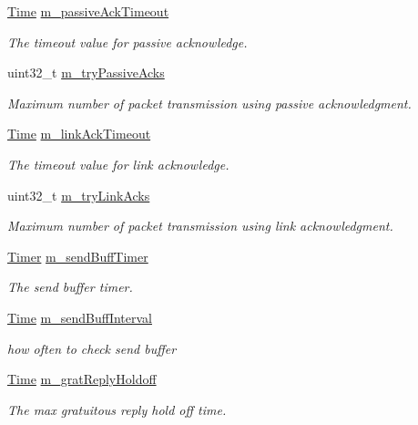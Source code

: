 \begin{DoxyCompactItemize}
\hyperlink{classns3_1_1Time}{Time} \hyperlink{classns3_1_1dsr_1_1DsrRouting_a6155bddae63f0e1fda8afbeebc25a54c}{m\+\_\+passive\+Ack\+Timeout}
\begin{DoxyCompactList}\small\item\em The timeout value for passive acknowledge. \end{DoxyCompactList}\item 
uint32\+\_\+t \hyperlink{classns3_1_1dsr_1_1DsrRouting_aadd1dd676ec50cae94ffd6f2eefb277c}{m\+\_\+try\+Passive\+Acks}
\begin{DoxyCompactList}\small\item\em Maximum number of packet transmission using passive acknowledgment. \end{DoxyCompactList}\item 
\hyperlink{classns3_1_1Time}{Time} \hyperlink{classns3_1_1dsr_1_1DsrRouting_ace1671263c7f09cd2523f1c81dc41631}{m\+\_\+link\+Ack\+Timeout}
\begin{DoxyCompactList}\small\item\em The timeout value for link acknowledge. \end{DoxyCompactList}\item 
uint32\+\_\+t \hyperlink{classns3_1_1dsr_1_1DsrRouting_acecdd106e259c448bcfa6a6cef901658}{m\+\_\+try\+Link\+Acks}
\begin{DoxyCompactList}\small\item\em Maximum number of packet transmission using link acknowledgment. \end{DoxyCompactList}\item 
\hyperlink{classns3_1_1Timer}{Timer} \hyperlink{classns3_1_1dsr_1_1DsrRouting_a7676aff7f691319b764fba26a726ef5d}{m\+\_\+send\+Buff\+Timer}
\begin{DoxyCompactList}\small\item\em The send buffer timer. \end{DoxyCompactList}\item 
\hyperlink{classns3_1_1Time}{Time} \hyperlink{classns3_1_1dsr_1_1DsrRouting_a966d7c644a941e3e6365859983816e8b}{m\+\_\+send\+Buff\+Interval}
\begin{DoxyCompactList}\small\item\em how often to check send buffer \end{DoxyCompactList}\item 
\hyperlink{classns3_1_1Time}{Time} \hyperlink{classns3_1_1dsr_1_1DsrRouting_a43f5d8b4569f2122788518584ce3ae77}{m\+\_\+grat\+Reply\+Holdoff}
\begin{DoxyCompactList}\small\item\em The max gratuitous reply hold off time. \end{DoxyCompactList}\item 

\end{DoxyCompactItemize}
